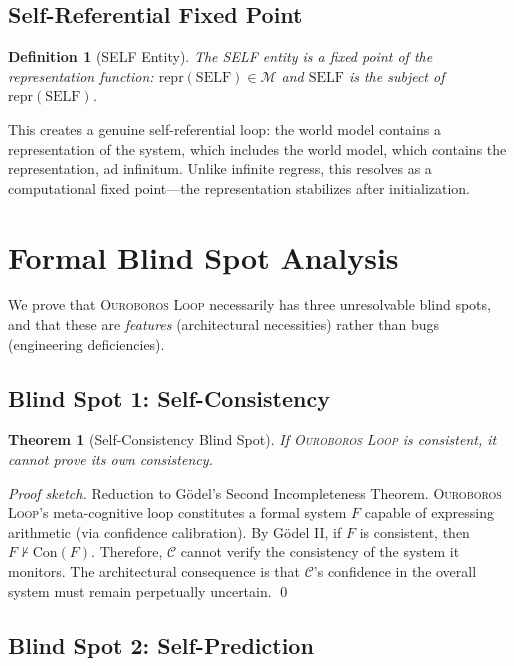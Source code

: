 \documentclass[11pt,a4paper]{article}
\newtheorem{definition}{Definition}[section]
\newtheorem{theorem}{Theorem}[section]
\newcommand{\OL}{\textsc{Ouroboros Loop}}
\newcommand{\WM}{\mathcal{M}}  %
\newcommand{\MC}{\mathcal{C}}  %
\begin{document}
\subsection{Self-Referential Fixed Point}

\begin{definition}[SELF Entity]
\label{def:self}
The SELF entity is a fixed point of the representation function:
$\text{repr}(\text{SELF}) \in \WM$ and $\text{SELF}$ is the
subject of $\text{repr}(\text{SELF})$.
\end{definition}

This creates a genuine self-referential loop: the world model contains
a representation of the system, which includes the world model, which
contains the representation, ad infinitum. Unlike infinite regress,
this resolves as a computational fixed point---the representation
stabilizes after initialization.

\section{Formal Blind Spot Analysis}
\label{sec:blind-spots}

We prove that \OL{} necessarily has three unresolvable blind spots,
and that these are \emph{features} (architectural necessities) rather
than bugs (engineering deficiencies).

\subsection{Blind Spot 1: Self-Consistency}

\begin{theorem}[Self-Consistency Blind Spot]
\label{thm:bs1}
If \OL{} is consistent, it cannot prove its own consistency.
\end{theorem}
\begin{proof}[Proof sketch]
Reduction to G\"odel's Second Incompleteness Theorem. \OL{}'s
meta-cognitive loop constitutes a formal system $F$ capable of
expressing arithmetic (via confidence calibration). By G\"odel II,
if $F$ is consistent, then $F \nvdash \text{Con}(F)$. Therefore,
$\MC$ cannot verify the consistency of the system it monitors.
The architectural consequence is that $\MC$'s confidence in the
overall system must remain perpetually uncertain. \qed
\end{proof}

\subsection{Blind Spot 2: Self-Prediction}
\end{document}
